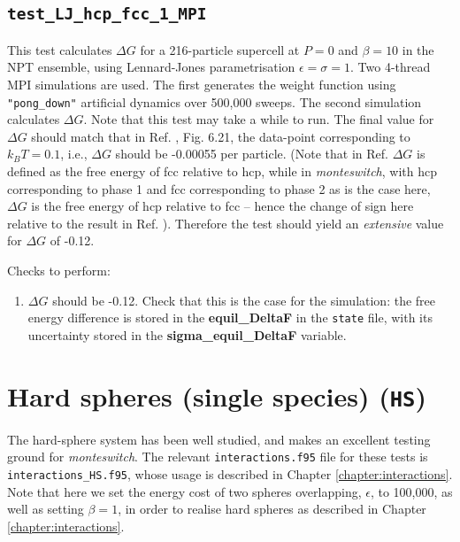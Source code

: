 \documentclass{report}
\begin{document}
\subsection{\texttt{test\_LJ\_hcp\_fcc\_1\_MPI}}
This test calculates $\Delta G$ for a 216-particle supercell at $P=0$ and $\beta=10$ in the NPT ensemble, using Lennard-Jones 
parametrisation $\epsilon=\sigma=1$. Two 4-thread MPI simulations are used. The first generates the weight function using 
\texttt{"pong\_down"} artificial dynamics over 500,000 sweeps. The second simulation calculates $\Delta G$. Note that this 
test may take a while to run. The final value for $\Delta G$ should match that in Ref. \cite{thesis:Jackson}, Fig. 6.21, 
the data-point corresponding to $k_BT=0.1$, i.e., $\Delta G$ should be -0.00055 per particle. (Note that in Ref. \cite{thesis:Jackson} 
$\Delta G$ is defined as the free energy of fcc relative to hcp, while in \emph{monteswitch}, with hcp corresponding to 
phase 1 and fcc corresponding to phase 2 as is the case here, $\Delta G$ is the free energy of hcp relative to fcc -- hence 
the change of sign here relative to the result in Ref. \cite{thesis:Jackson}). Therefore the test should yield an \emph{extensive} 
value for $\Delta G$ of -0.12.

Checks to perform:
\begin{enumerate}
\item
$\Delta G$ should be -0.12. Check that this is the case for the
simulation: the free energy difference is stored in the \textbf{equil\_DeltaF} in the \texttt{state} file, with its uncertainty
stored in the \textbf{sigma\_equil\_DeltaF} variable.
\end{enumerate}


\section{Hard spheres (single species) (\texttt{HS})}
The hard-sphere system has been well studied, and makes an excellent testing ground for \emph{monteswitch}.
The relevant \texttt{interactions.f95} file for these tests is \texttt{interactions\_HS.f95}, whose usage is described in Chapter
\ref{chapter:interactions}. Note that here we set the energy cost of two spheres overlapping,
$\epsilon$, to 100,000, as well as setting $\beta=1$, in order to realise hard spheres as described in Chapter \ref{chapter:interactions}.
\end{document}
